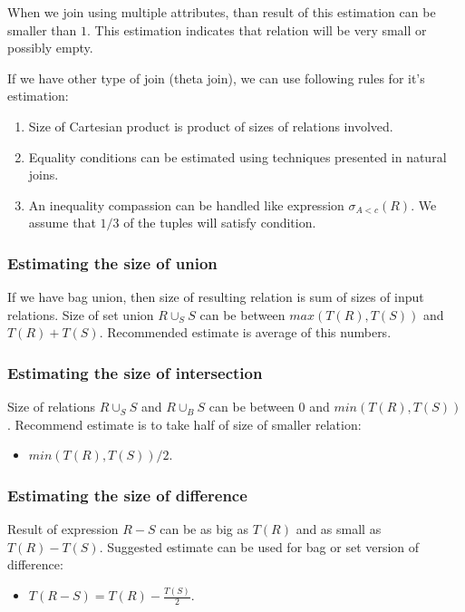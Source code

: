 When we join using multiple attributes, than result of this estimation can be smaller than $1$. This estimation indicates that relation will be very small or possibly empty.

If we have other type of join (theta join), we can use following rules for it's estimation:
\begin{enumerate}
\item Size of Cartesian product is product of sizes of relations involved.
\item Equality conditions can be estimated using techniques presented in natural joins.
\item An inequality compassion can be handled like expression $\sigma_{A<c}(R)$. We assume that $1/3$ of the tuples will satisfy condition. 
\end{enumerate}

\subsubsection{Estimating the size of union}

If we have bag union, then size of resulting relation is sum of sizes of input relations. Size of set union $R \cup_S S$ can be between $max(T(R),T(S))$ and $T(R)+T(S)$. Recommended estimate is average of this numbers. 

\subsubsection{Estimating the size of intersection}
Size of relations $R\cup_S S$ and $R\cup_B S$ can be between $0$ and $min(T(R),T(S))$. Recommend estimate is to take half of size of smaller relation:
\begin{itemize}
\item  $min(T(R),T(S))/2$.
\end{itemize}

\subsubsection{Estimating the size of difference}

Result of expression $R-S$ can be as big as $T(R)$ and as small as $T(R)-T(S)$. Suggested estimate can be used for bag or set version of difference: 
\begin{itemize}
\item  $T(R-S)=T(R)-\frac{T(S)}{2}$.
\end{itemize}
